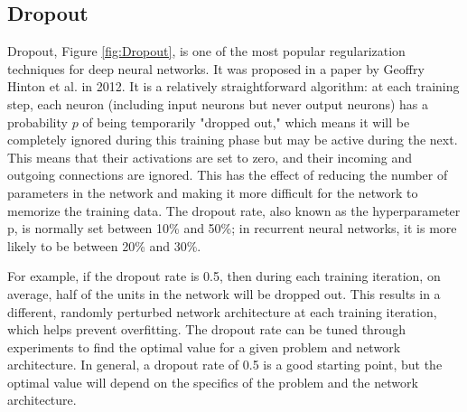 \subsection{Dropout}
Dropout, Figure \ref{fig:Dropout}, is one of the most popular regularization techniques for deep neural networks. It was proposed in a paper \parencite{hinton2012improving} by Geoffry Hinton et al. in 2012. 
It is a relatively straightforward algorithm: at each training step, each neuron (including input neurons but never output neurons) has a probability $p$ of being temporarily "dropped out," which means it will be completely ignored during this training phase but may be active during the next. This means that their activations are set to zero, and their incoming and outgoing connections are ignored. This has the effect of reducing the number of parameters in the network and making it more difficult for the network to memorize the training data. The dropout rate, also known as the hyperparameter p, is normally set between 10\% and 50\%; in recurrent neural networks, it is more likely to be between 20\% and 30\%. 



For example, if the dropout rate is 0.5, then during each training iteration, on average, half of the units in the network will be dropped out. This results in a different, randomly perturbed network architecture at each training iteration, which helps prevent overfitting. The dropout rate can be tuned through experiments to find the optimal value for a given problem and network architecture. In general, a dropout rate of 0.5 is a good starting point, but the optimal value will depend on the specifics of the problem and the network architecture.
